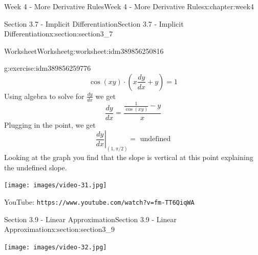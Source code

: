 \documentclass[oneside,10pt,]{book}
\newcommand{\mono}[1]{\texttt{#1}}
\numberwithin{equation}{section}
\newlength{\qrsize}
\newlength{\previewwidth}
\begin{document}
\begin{chapterptx}{Week 4 - More Derivative Rules}{}{Week 4 - More Derivative Rules}{}{}{x:chapter:week4}
\begin{sectionptx}{Section 3.7 - Implicit Differentiation}{}{Section 3.7 - Implicit Differentiation}{}{}{x:section:section3_7}
\begin{worksheet-subsection}{Worksheet}{}{Worksheet}{}{}{g:worksheet:idm389856250816}
\begin{divisionexercise}{3}{}{}{g:exercise:idm389856259776}
\begin{equation*}
\cos(xy)\cdot \left( x \frac{dy}{dx}+y\right) = 1 
\end{equation*}
Using algebra to solve for \(\frac{dy}{dx}\) we get%
\begin{equation*}
\frac{dy}{dx} =\frac{\frac{1}{\cos(xy)}-y}{x} 
\end{equation*}
Plugging in the point, we get%
\begin{equation*}
\left. \frac{dy}{dx} \right\vert_{(1,\pi/2)} = \text{ undefined} 
\end{equation*}
Looking at the graph you find that the slope is vertical at this point explaining the undefined slope.%
\end{divisionexercise}%
\end{worksheet-subsection}
\restoregeometry
\setlength{\qrsize}{9em}
\setlength{\previewwidth}{\linewidth}
\addtolength{\previewwidth}{-\qrsize}
\begin{tcbraster}[raster columns=2, raster column skip=1pt, raster halign=center, raster force size=false, raster left skip=0pt, raster right skip=0pt]%
\begin{tcolorbox}[previewstyle, width=\previewwidth]%
\texttt{[image: images/video-31.jpg]}%
\end{tcolorbox}%
\begin{tcolorbox}[qrstyle]%
{\hypersetup{urlcolor=black}}%
\end{tcolorbox}%
\begin{tcolorbox}[captionstyle]%
\small YouTube: \mono{https://www.youtube.com/watch?v=fm-TT6QiqWA}\end{tcolorbox}%
\end{tcbraster}%
\end{sectionptx}
%
%
\typeout{************************************************}
\typeout{************************************************}
%
\begin{sectionptx}{Section 3.9 - Linear Approximation}{}{Section 3.9 - Linear Approximation}{}{}{x:section:section3_9}
\setlength{\qrsize}{9em}
\setlength{\previewwidth}{\linewidth}
\addtolength{\previewwidth}{-\qrsize}
\begin{tcbraster}[raster columns=2, raster column skip=1pt, raster halign=center, raster force size=false, raster left skip=0pt, raster right skip=0pt]%
\begin{tcolorbox}[previewstyle, width=\previewwidth]%
\texttt{[image: images/video-32.jpg]}%

\end{tcolorbox}
\end{tcbraster}
\end{sectionptx}
\end{chapterptx}
\end{document}
